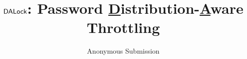 \documentclass[USenglish,oneside,twocolumn]{article}
\begin{document}
 

  \author*[1]{Anonymous Submission}







\title{$\mathsf{DALock}$: Password \underline{D}istribution-\underline{A}ware Throttling}



\begin{abstract}
{}
\end{abstract}


 

\maketitle
\raggedbottom
\vspace{-1.5cm}
 
\clearpage



\end{document}
